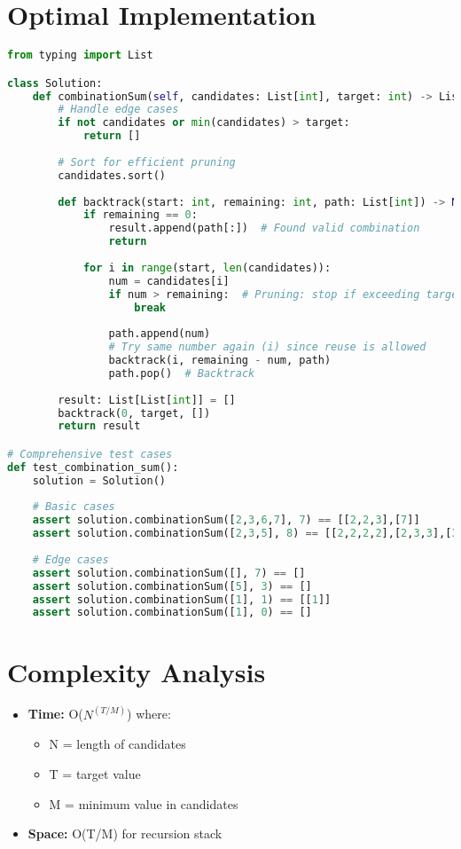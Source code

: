 \section*{Optimal Implementation}
\begin{fullwidth}
\begin{lstlisting}[language=Python]
from typing import List

class Solution:
    def combinationSum(self, candidates: List[int], target: int) -> List[List[int]]:
        # Handle edge cases
        if not candidates or min(candidates) > target:
            return []
            
        # Sort for efficient pruning
        candidates.sort()
        
        def backtrack(start: int, remaining: int, path: List[int]) -> None:
            if remaining == 0:
                result.append(path[:])  # Found valid combination
                return
                
            for i in range(start, len(candidates)):
                num = candidates[i]
                if num > remaining:  # Pruning: stop if exceeding target
                    break
                    
                path.append(num)
                # Try same number again (i) since reuse is allowed
                backtrack(i, remaining - num, path)
                path.pop()  # Backtrack
        
        result: List[List[int]] = []
        backtrack(0, target, [])
        return result

# Comprehensive test cases
def test_combination_sum():
    solution = Solution()
    
    # Basic cases
    assert solution.combinationSum([2,3,6,7], 7) == [[2,2,3],[7]]
    assert solution.combinationSum([2,3,5], 8) == [[2,2,2,2],[2,3,3],[3,5]]
    
    # Edge cases
    assert solution.combinationSum([], 7) == []
    assert solution.combinationSum([5], 3) == []
    assert solution.combinationSum([1], 1) == [[1]]
    assert solution.combinationSum([1], 0) == []
\end{lstlisting}
\end{fullwidth}

\section*{Complexity Analysis}
\begin{itemize}
    \item \textbf{Time:} O($N^(T/M)$) where:
        \begin{itemize}
            \item N = length of candidates
            \item T = target value
            \item M = minimum value in candidates
        \end{itemize}
    \item \textbf{Space:} O(T/M) for recursion stack
\end{itemize}

